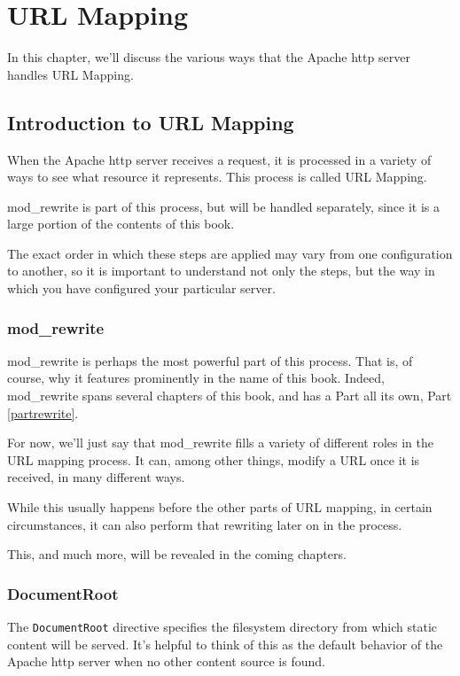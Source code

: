 \part{URL Mapping}

In this chapter, we'll discuss the various ways that the Apache http
server handles URL Mapping.

\chapter{Introduction to URL Mapping}

When the Apache http server receives a request, it is processed in a
variety of ways to see what resource it represents. This process is
called URL Mapping. 

mod\_rewrite is part of this process, but will be handled separately,
since it is a large portion of the contents of this book.

The exact order in which these steps are applied may vary from one
configuration to another, so it is important to understand not only the
steps, but the way in which you have configured your particular server.

\section{mod\_rewrite}

mod\_rewrite is perhaps the most powerful part of this process. That
is, of course, why it features prominently in the name of this book.
Indeed, mod\_rewrite spans several chapters of this book, and has a Part all its own, Part \ref{partrewrite}.

For now, we'll just say that mod\_rewrite fills a variety of
different roles in the URL mapping process. It can, among other things,
modify a URL once it is received, in many different ways.

While this usually happens before the other parts of URL mapping, in
certain circumstances, it can also perform that rewriting later on in
the process. 

This, and much more, will be revealed in the coming chapters.

\section{DocumentRoot}
\label{documentroot}

The \verb~DocumentRoot~ directive specifies the filesystem directory from which static content will be served. It's helpful to think of this as the default behavior of the Apache http server when no other content source is found.

